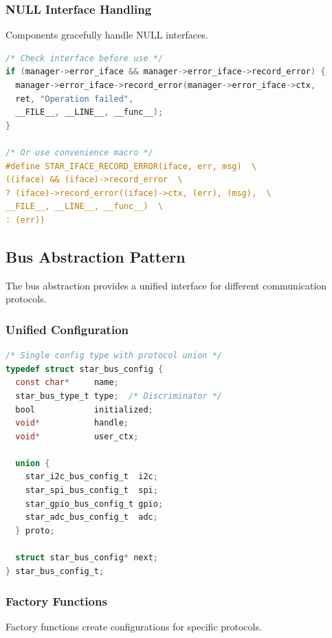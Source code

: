\subsubsection{NULL Interface Handling}

Components gracefully handle NULL interfaces.

\begin{lstlisting}[language=C]
/* Check interface before use */
if (manager->error_iface && manager->error_iface->record_error) {
  manager->error_iface->record_error(manager->error_iface->ctx,
  ret, "Operation failed",
  __FILE__, __LINE__, __func__);
}

/* Or use convenience macro */
#define STAR_IFACE_RECORD_ERROR(iface, err, msg)  \
((iface) && (iface)->record_error  \
? (iface)->record_error((iface)->ctx, (err), (msg),  \
__FILE__, __LINE__, __func__)  \
: (err))
\end{lstlisting}

\subsection{Bus Abstraction Pattern}

The bus abstraction provides a unified interface for different communication protocols.

\subsubsection{Unified Configuration}

\begin{lstlisting}[language=C]
/* Single config type with protocol union */
typedef struct star_bus_config {
  const char*     name;
  star_bus_type_t type;  /* Discriminator */
  bool            initialized;
  void*           handle;
  void*           user_ctx;
  
  union {
    star_i2c_bus_config_t  i2c;
    star_spi_bus_config_t  spi;
    star_gpio_bus_config_t gpio;
    star_adc_bus_config_t  adc;
  } proto;
  
  struct star_bus_config* next;
} star_bus_config_t;
\end{lstlisting}

\subsubsection{Factory Functions}

Factory functions create configurations for specific protocols.

